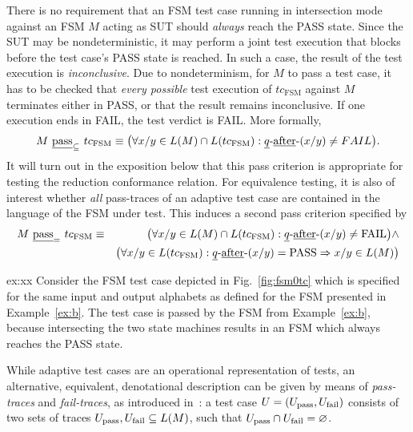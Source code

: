 There is no requirement that an FSM test case running in intersection mode against
an FSM $M$ acting as SUT should {\it always} reach the PASS state. Since the SUT may be nondeterministic, it may perform a joint test execution that blocks before
the test case's PASS state is reached. In such a case, the result of the test execution is \emph{inconclusive}. Due to nondeterminism, for $M$ to pass a test case, it
has to be 
checked that {\it every possible} test execution of  $tc_\text{FSM}$ against $M$
terminates either in PASS, or that the result remains inconclusive. If one execution ends in FAIL, the test verdict is FAIL. More formally,
\[
M\ \underline{\text{pass}}_\subseteq\ tc_\text{FSM} \equiv
\big(
\forall x/y \in L(M)\cap L(tc_\text{FSM}): \underline{q}\text{-\underline{after}-}(x/y) \neq FAIL
\big).
\]
It will turn out in the exposition below that this pass criterion is appropriate for 
testing the reduction conformance relation. For equivalence testing, it is also of 
interest whether {\it all} pass-traces of an adaptive test case are contained
in the language of the FSM under test. This induces a second pass criterion specified by
\begin{eqnarray*}
M\ \underline{\text{pass}}_=\ tc_\text{FSM} & \equiv &
\big(
\forall x/y \in L(M)\cap L(tc_\text{FSM}): \underline{q}\text{-\underline{after}-}(x/y) \neq \text{FAIL}
\big) \wedge
\\ & &
\big(
\forall x/y \in L(tc_\text{FSM}): \underline{q}\text{-\underline{after}-}(x/y) = \text{PASS} \Rightarrow
x/y\in L(M)
\big)
\end{eqnarray*}

\begin{example}{ex:xx}
Consider the FSM test case depicted in Fig.~\ref{fig:fsm0tc} which is specified
for the same input and output alphabets as defined for  the FSM presented in Example~\ref{ex:b}. The test case is passed by the FSM from Example~\ref{ex:b}, because
intersecting the two state machines results in an FSM which always reaches the PASS state.
\end{example}

While adaptive test cases are an operational representation of tests, an alternative, equivalent, denotational description can be given by means of \emph{pass-traces} and \emph{fail-traces}, as introduced in~\cite{huang_peleska_2017sttt}: a test case 
$U = ({U}_\text{pass},{U}_\text{fail})$ consists of two sets of traces 
${U}_\text{pass}, {U}_\text{fail}\subseteq L(M)$, such that ${U}_\text{pass} \cap {U}_\text{fail} = \varnothing$.






